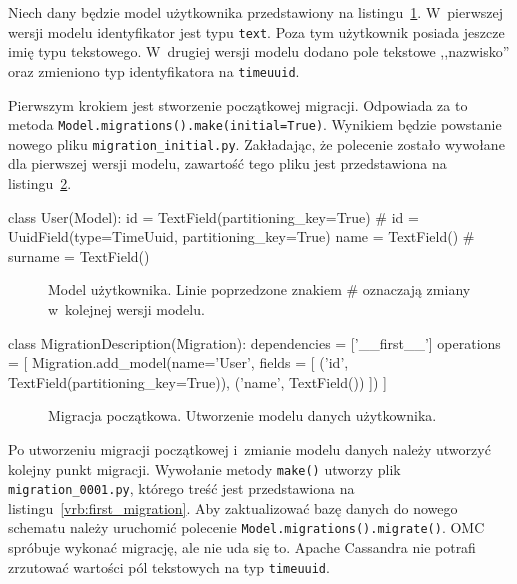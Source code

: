 Niech dany będzie model użytkownika przedstawiony na listingu~\ref{vrb:user_for_migrations}. W~pierwszej wersji modelu identyfikator jest typu \verb+text+. Poza tym użytkownik posiada jeszcze imię typu tekstowego. W~drugiej wersji modelu dodano pole tekstowe ,,nazwisko'' oraz zmieniono typ identyfikatora na \verb+timeuuid+. 

Pierwszym krokiem jest stworzenie początkowej migracji. Odpowiada za to metoda \verb+Model.migrations().make(initial=True)+. Wynikiem będzie powstanie nowego pliku \verb+migration_initial.py+. Zakładając, że polecenie zostało wywołane dla pierwszej wersji modelu, zawartość tego pliku jest przedstawiona na listingu~\ref{vrb:initial_migration}.

\begin{verbbox}[\footnotesize]
class User(Model):
    id = TextField(partitioning_key=True)
    # id = UuidField(type=TimeUuid, partitioning_key=True)
    name = TextField()
    # surname = TextField()
\end{verbbox}

\begin{figure}[ht!]
	\centering
	\theverbbox
	\caption{Model użytkownika. Linie poprzedzone znakiem \# oznaczają zmiany w~kolejnej wersji modelu.}
	\label{vrb:user_for_migrations}
\end{figure}

\begin{verbbox}[\footnotesize]
class MigrationDescription(Migration):
    dependencies = ['__first__']
    operations = [
        Migration.add_model(name='User',
          fields = [
            ('id', TextField(partitioning_key=True)),
            ('name', TextField()) 
          ])
    ]
\end{verbbox}

\begin{figure}[ht!]
	\centering
	\theverbbox
	\caption{Migracja początkowa. Utworzenie modelu danych użytkownika.}
	\label{vrb:initial_migration}
\end{figure}

Po utworzeniu migracji początkowej i~zmianie modelu danych należy utworzyć kolejny punkt migracji. Wywołanie metody \verb+make()+ utworzy plik \verb+migration_0001.py+, którego treść jest przedstawiona na listingu~\ref{vrb:first_migration}. Aby zaktualizować bazę danych do nowego schematu należy uruchomić polecenie \verb+Model.migrations().migrate()+. OMC spróbuje wykonać migrację, ale nie uda się to. Apache Cassandra nie potrafi zrzutować wartości pól tekstowych na typ \verb+timeuuid+.

